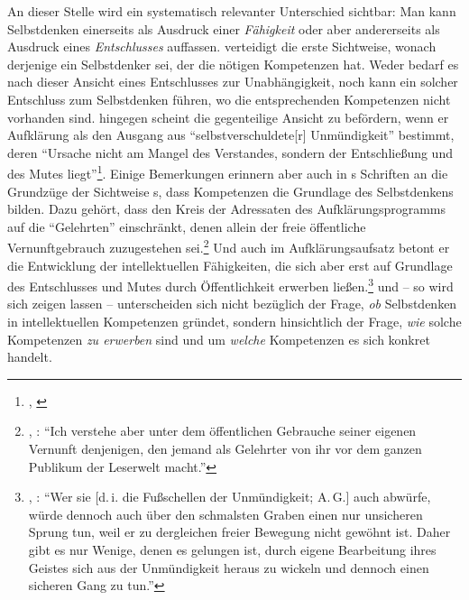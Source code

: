 An dieser Stelle wird ein systematisch relevanter Unterschied sichtbar: Man kann
Selbstdenken einerseits als Ausdruck einer \emph{Fähigkeit} oder aber andererseits als
Ausdruck eines \emph{Entschlusses} auffassen.  verteidigt die
erste Sichtweise, wonach derjenige ein Selbstdenker sei, der die nötigen
Kompetenzen hat. Weder bedarf es nach dieser Ansicht eines Entschlusses zur
Unabhängigkeit, noch kann ein solcher Entschluss zum Selbstdenken führen, wo die entsprechenden
Kompetenzen nicht vorhanden sind.  hingegen scheint die
gegenteilige Ansicht zu befördern, wenn er Aufklärung als den Ausgang aus
\enquote{selbstverschuldete[r] Unmündigkeit} bestimmt, deren \enquote{Ursache
\punkt{} nicht am Mangel des Verstandes, sondern der Entschließung und des Mutes
liegt}\footnote{\cite[][A~481]{Kant:BeantwortungderFrage:WasistAufklaerung?1977},
\cite[][VIII: 35.4--5]{Kant:GesammelteWerke1900ff.}}. Einige Bemerkungen
erinnern aber auch in s Schriften an die Grundzüge der Sichtweise
s, dass Kompetenzen die Grundlage des Selbstdenkens bilden.
Dazu gehört, dass   den Kreis der Adressaten des Aufklärungsprogramms auf die
\enquote{Gelehrten} einschränkt, denen allein der freie öffentliche
Vernunftgebrauch zuzugestehen sei.\footnote{\cite[Vgl.][A
485]{Kant:BeantwortungderFrage:WasistAufklaerung?1977}, \cite[][VIII:
37.11--13]{Kant:GesammelteWerke1900ff.}: \enquote{Ich verstehe aber unter dem
öffentlichen Gebrauche seiner eigenen Vernunft denjenigen, den jemand als
Gelehrter von ihr vor dem ganzen Publikum der Leserwelt macht.}} Und auch im
Aufklärungsaufsatz betont er die Entwicklung der intellektuellen Fähigkeiten,
die sich aber erst auf Grundlage des Entschlusses und Mutes durch Öffentlichkeit
erwerben
ließen.\footnote{\cite[Vgl.][]{Kant:BeantwortungderFrage:WasistAufklaerung?1977},
\cite[][VIII: 36.10--15]{Kant:GesammelteWerke1900ff.}: \enquote{Wer sie
[d.\,i. die Fußschellen der Unmündigkeit; A.\,G.] auch abwürfe, würde dennoch
auch über den schmalsten Graben einen nur unsicheren Sprung tun, weil er zu
dergleichen freier Bewegung nicht gewöhnt ist. Daher gibt es nur Wenige, denen
es gelungen ist, durch eigene Bearbeitung ihres Geistes sich aus der
Unmündigkeit heraus zu wickeln und dennoch einen sicheren Gang zu tun.}}
 und  -- so wird sich zeigen lassen
-- unterscheiden sich nicht bezüglich der Frage, \emph{ob} Selbstdenken in
intellektuellen Kompetenzen gründet, sondern hinsichtlich der Frage, \emph{wie}
solche Kompetenzen \emph{zu erwerben} sind und um \emph{welche} Kompetenzen es
sich konkret handelt.

